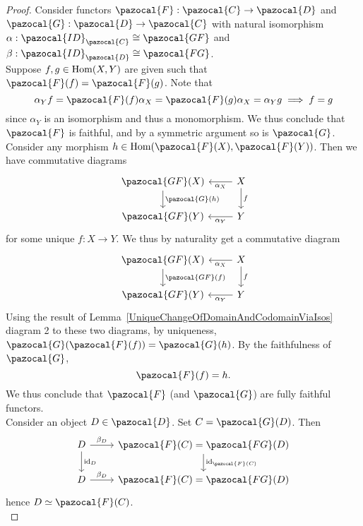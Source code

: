     \begin{proof}
        Consider functors $\pazocal{F}:\pazocal{C}\rightarrow \pazocal{D}$ and $\pazocal{G}:\pazocal{D}\rightarrow \pazocal{C}$ with natural isomorphism $\alpha: \pazocal{ID}_\pazocal{C}\cong \pazocal{GF}$ and $\beta : \pazocal{ID}_\pazocal{D}\cong \pazocal{FG}$.\\
         Suppose $f,g\in\mathrm{Hom}(X,Y)$ are given such that $\pazocal{F}(f)=\pazocal{F}(g)$. Note that
        $$
            \alpha_Y f =  \pazocal{F}(f)\alpha_X = \pazocal{F}(g)\alpha_X = \alpha_Y g \implies f=g 
        $$
        since $\alpha_Y$ is an isomorphism and thus a monomorphism. We thus conclude that $\pazocal{F}$ is faithful, and by a symmetric argument so is $\pazocal{G}$.\\
        Consider any morphism $h\in \Hom(\pazocal{F}(X),\pazocal{F}(Y))$. Then we have commutative diagrams 
        $$
            \begin{tikzcd}
                \pazocal{GF}(X) \arrow[d,"\pazocal{G}(h)"] & X \arrow[l,"\alpha_X"]\arrow[d,"f"]\\ 
                \pazocal{GF}(Y) & Y \arrow[l,"\alpha_Y"]   
            \end{tikzcd}
        $$  
        for some unique $f : X\rightarrow Y$. We thus by naturality get a commutative diagram
        $$
            \begin{tikzcd}
                \pazocal{GF}(X) \arrow[d,"\pazocal{GF}(f)"] & X \arrow[l,"\alpha_X"]\arrow[d,"f"]\\ 
                \pazocal{GF}(Y) & Y \arrow[l,"\alpha_Y"]   
            \end{tikzcd}
        $$
        Using the result of Lemma~\ref{UniqueChangeOfDomainAndCodomainViaIsos} diagram 2 to these two diagrams, by uniqueness, $\pazocal{G}(\pazocal{F}(f))=\pazocal{G}(h)$. By the faithfulness of $\pazocal{G}$, 
        $$
            \pazocal{F}(f) = h.
        $$  
        We thus conclude that $\pazocal{F}$ (and $\pazocal{G}$) are fully faithful functors.\\ 
        Consider an object $D\in \pazocal{D}$. Set $C= \pazocal{G}(D)$. Then 
        $$
            \begin{tikzcd}
                D \arrow[r,"\beta_D"]\arrow[d,"\id_D"] & \pazocal{F}(C) = \pazocal{FG}(D) \arrow[d,"\id_{\pazocal{F}(C)}"]\\
                D \arrow[r,"\beta_D"] & \pazocal{F}(C) = \pazocal{FG}(D)
            \end{tikzcd}
        $$
        hence $D\simeq \pazocal{F}(C)$.\\ 

\end{proof}
